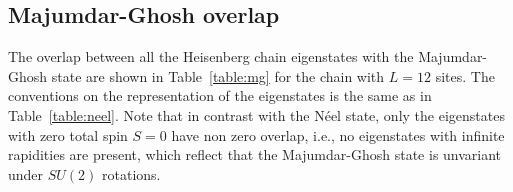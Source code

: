 \documentclass[11pt]{iopart}
\begin{document}
\subsection{Majumdar-Ghosh overlap}
\label{app-mg}

The overlap between all the Heisenberg chain eigenstates with the Majumdar-Ghosh state are shown in 
Table~\ref{table:mg} for the chain with $L=12$ sites. The conventions on the representation of 
the eigenstates is the same as in Table~\ref{table:neel}. Note that in contrast with the N\'eel 
state, only the eigenstates with zero total spin $S=0$ have non zero overlap, i.e., no eigenstates 
with infinite rapidities are present, which reflect that the Majumdar-Ghosh state is unvariant 
under $SU(2)$ rotations. 

\newpage

\end{document}
